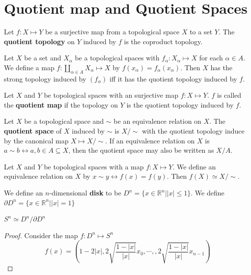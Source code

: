 \documentclass[12pt]{book}
\begin{document}
\section{Quotient map and Quotient Spaces}

\begin{definition}
	Let $f:X \mapsto Y$ be a surjective map from a topological space $X$ to a set $Y$. The {\bf quotient topology} on $Y$ induced by $f$ is the coproduct topology.
\end{definition}

\begin{lemma}
	Let $X$ be a set and $X_\alpha$ be a topological spaces with $f_\alpha:X_\alpha \mapsto X$ for each $\alpha\in A$. We define a map $f:\coprod_{\alpha\in A}X_\alpha\mapsto X$ by $f(x_\alpha)=f_\alpha(x_\alpha)$. Then $X$ has the strong topology induced by $(f_\alpha)$ iff it has the quotient topology induced by $f$.
\end{lemma}

\begin{definition}
	Let $X$ and $Y$ be topological spaces with an surjective map $f:X \mapsto Y$. $f$ is called the {\bf quotient map} if the topology on $Y$ is the quotient topology induced by $f$.
\end{definition}

\begin{definition}
	Let $X$ be a topological space and $\sim$ be an equivalence relation on $X$. The {\bf quotient space} of $X$ induced by $\sim$ is $X/\sim$ with the quotient topology induce by the canonical map $X\mapsto X/\sim$. If an equivalence relation on $X$ is $a\sim b\leftrightarrow a,b\in A\subseteq X$, then the quotient space may also be written as $X/A$.
\end{definition}

\begin{lemma}
	Let $X$ and $Y$ be topological spaces with a map $f:X \mapsto Y$. We define an equivalence relation on $X$ by $x\sim y\leftrightarrow f(x)=f(y)$. Then $f(X)\simeq X/\sim$. 
\end{lemma}

\begin{definition}
	We define an $n$-dimensional {\bf disk} to be $D^n=\{x\in \mathbb R^n||x|\leq 1\}$. We define $\partial D^n=\{x\in \mathbb R^n||x|= 1\}$
\end{definition}

\begin{lemma}
	$S^n\simeq D^n/\partial D^n$
\end{lemma}
\begin{proof}
	Consider the map $f:D^n\mapsto S^n$
	\begin{equation}
		f(x)=(1-2|x|,2\sqrt{\frac{1-|x|}{|x|}}x_0,\cdots,,2\sqrt{\frac{1-|x|}{|x|}}x_{n-1})
	\end{equation}
\end{proof}
\end{document}
